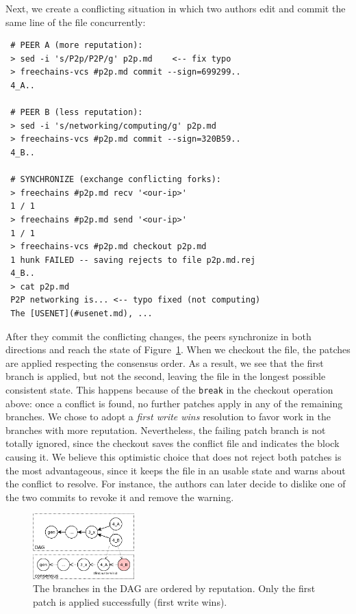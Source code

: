 \documentclass[10pt,journal,compsoc]{IEEEtran}
\newcommand{\code}[1]  {\texttt{\footnotesize{#1}}}
\begin{document}
Next, we create a conflicting situation in which two authors edit and commit
the same line of the file concurrently:

{\footnotesize
\begin{verbatim}
 # PEER A (more reputation):
 > sed -i 's/P2p/P2P/g' p2p.md    <-- fix typo
 > freechains-vcs #p2p.md commit --sign=699299..
 4_A..

 # PEER B (less reputation):
 > sed -i 's/networking/computing/g' p2p.md
 > freechains-vcs #p2p.md commit --sign=320B59..
 4_B..

 # SYNCHRONIZE (exchange conflicting forks):
 > freechains #p2p.md recv '<our-ip>'
 1 / 1
 > freechains #p2p.md send '<our-ip>'
 1 / 1
 > freechains-vcs #p2p.md checkout p2p.md
 1 hunk FAILED -- saving rejects to file p2p.md.rej
 4_B..
 > cat p2p.md
 P2P networking is... <-- typo fixed (not computing)
 The [USENET](#usenet.md), ...
\end{verbatim}
}

After they commit the conflicting changes, the peers synchronize in both
directions and reach the state of Figure~\ref{fig.conflict}.
When we checkout the file, the patches are applied respecting the consensus
order.
As a result, we see that the first branch is applied, but not the second,
leaving the file in the longest possible consistent state.
%
This happens because of the \code{break} in the checkout operation above:
once a conflict is found, no further patches apply in any of the remaining
branches.
%
We chose to adopt a \emph{first write wins} resolution to favor work in the
branches with more reputation.
Nevertheless, the failing patch branch is not totally ignored, since the
checkout saves the conflict file and indicates the block causing it.
%
We believe this optimistic choice that does not reject both patches is the most
advantageous, since it keeps the file in an usable state and warns about the
conflict to resolve.
For instance, the authors can later decide to dislike one of the two commits to
revoke it and remove the warning.

\begin{figure}
\centering
\includegraphics[width=0.35\textwidth]{conflict.png}
\caption{
    The branches in the DAG are ordered by reputation.
    Only the first patch is applied successfully (first write wins).
}
\label{fig.conflict}
\end{figure}
\end{document}
